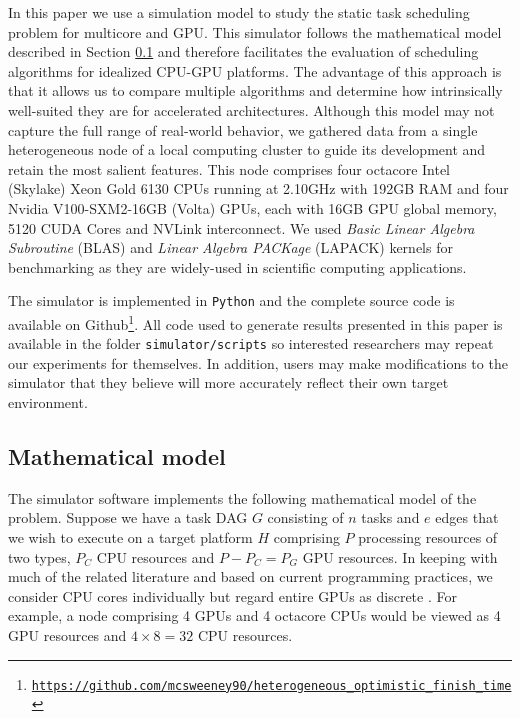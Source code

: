\documentclass[runningheads]{llncs}
\begin{document}
In this paper we use a simulation model to study the static task scheduling problem for multicore and GPU. This simulator follows the mathematical model described in Section \ref{subsect.mathematical_model} and therefore facilitates the evaluation of scheduling algorithms for idealized CPU-GPU platforms. The advantage of this approach is that it allows us to compare multiple algorithms and determine how intrinsically well-suited they are for accelerated architectures. Although this model may not capture the full range of real-world behavior, we gathered data from a single heterogeneous node of a local computing cluster to guide its development and retain the most salient features. This node comprises four octacore Intel (Skylake) Xeon Gold 6130 CPUs running at 2.10GHz with 192GB RAM and four Nvidia V100-SXM2-16GB (Volta) GPUs, each with 16GB GPU global memory, 5120 CUDA Cores and NVLink interconnect. We used {\em Basic Linear Algebra Subroutine} (BLAS) \cite{Dongarra:1990:SLB:77626.79170} and {\em Linear Algebra PACKage} (LAPACK) \cite{laug} kernels for benchmarking as they are widely-used in scientific computing applications. 

The simulator is implemented in {\tt Python} and the complete source code is available on Github\footnote{\href{https://github.com/mcsweeney90/heterogeneous_optimistic_finish_time}{{\tt \small https://github.com/mcsweeney90/heterogeneous\_optimistic\_finish\_time}}}. All code used to generate results presented in this paper is available in the folder {\tt simulator/scripts} so interested researchers may repeat our experiments for themselves. In addition, users may make modifications to the simulator that they believe will more accurately reflect their own target environment. 


\subsection{Mathematical model}
\label{subsect.mathematical_model}

The simulator software implements the following mathematical model of the problem. Suppose we have a task DAG $G$ consisting of $n$ tasks and $e$ edges that we wish to execute on a target platform $H$ comprising $P$ processing resources of two types, $P_C$ CPU resources and $P - P_C = P_G$ GPU resources. In keeping with much of the related literature and based on current programming practices, we consider CPU cores individually but regard entire GPUs as discrete \cite{agullo2016}. For example, a node comprising 4 GPUs and 4 octacore CPUs would be viewed as 4 GPU resources and $4 \times 8 = 32$ CPU resources.   
\end{document}
